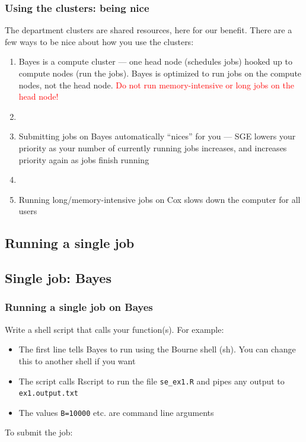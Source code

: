 \documentclass[12pt, 
hyperref={colorlinks=true, linkcolor=blue, urlcolor=cyan}]{beamer}
\newcommand{\myframe}[1]{\begin{frame} \frametitle{#1}}
\begin{document}
\myframe{Using the clusters: being nice}
The department clusters are shared resources, here for our benefit. There are a few ways to be nice about how you use the clusters:
\begin{enumerate}
\item Bayes is a compute cluster --- one head node (schedules jobs) hooked up to compute nodes (run the jobs). Bayes is optimized to run jobs on the compute nodes, not the head node. \textcolor{red}{Do not run memory-intensive or long jobs on the head node!}
\item[]
\item Submitting jobs on Bayes automatically ``nices'' for you --- SGE lowers your priority as your number of currently running jobs increases, and increases priority again as jobs finish running
\item[]
\item Running long/memory-intensive jobs on Cox slows down the computer for all users 
\end{enumerate}
\end{frame}

\subsection{Running a single job}
\subsection{Single job: Bayes}
\begin{frame}[fragile]
\frametitle{Running a single job on Bayes}
Write a shell script that calls your function(s). For example:
\begin{itemize}
\item The first line tells Bayes to run using the Bourne shell (sh). You can change this to another shell if you want
\item The script calls Rscript to run the file \texttt{se\_ex1.R} and pipes any output to \texttt{ex1.output.txt}
\item The values \texttt{B=10000} etc. are command line arguments
\end{itemize}

To submit the job:
\end{frame}
\end{document}
